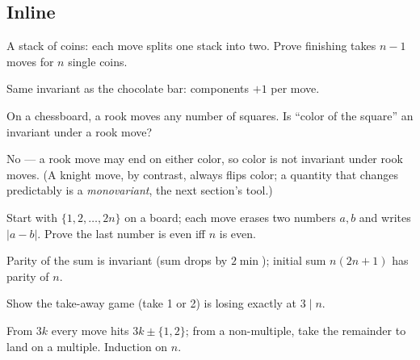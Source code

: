\subsection*{Inline}
\begin{exercise}[easy]\label{exr:iv1}
A stack of coins: each move splits one stack into two. Prove finishing
takes $n-1$ moves for $n$ single coins.
\end{exercise}
\begin{solution}
Same invariant as the chocolate bar: components $+1$ per move.
\end{solution}
\begin{exercise}[easy]\label{exr:iv2}
On a chessboard, a rook moves any number of squares. Is ``color of the
square'' an invariant under a rook move?
\end{exercise}
\begin{solution}
No --- a rook move may end on either color, so color is not invariant
under rook moves. (A knight move, by contrast, always flips color;
a quantity that changes predictably is a \emph{monovariant}, the next
section's tool.)
\end{solution}
\begin{exercise}[medium]\label{exr:iv3}
Start with $\{1,2,\dots,2n\}$ on a board; each move erases two numbers
$a,b$ and writes $|a-b|$. Prove the last number is even iff $n$ is even.
\end{exercise}
\begin{solution}
Parity of the sum is invariant (sum drops by $2\min$); initial sum
$n(2n+1)$ has parity of $n$.
\end{solution}
\begin{exercise}[medium]\label{exr:iv4}
Show the take-away game (take 1 or 2) is losing exactly at $3\mid n$.
\end{exercise}
\begin{solution}
From $3k$ every move hits $3k\pm\{1,2\}$; from a non-multiple, take the
remainder to land on a multiple. Induction on $n$.
\end{solution}
